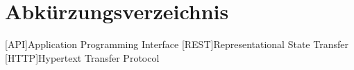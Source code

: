 \section*{Abkürzungsverzeichnis}   
\begin{acronym}[DHBW]
    [API]{Application Programming Interface}
    [REST]{Representational State Transfer}
    [HTTP]{Hypertext Transfer Protocol}
\end{acronym}